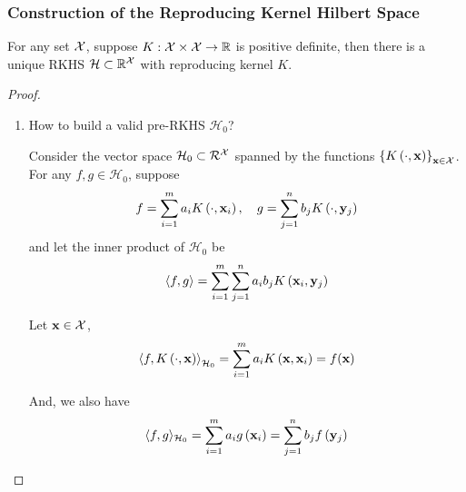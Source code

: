 \subsubsection{Construction of the Reproducing Kernel Hilbert Space}

\begin{theorem} \label{thm:morse-aronszajn}
	For any set ${\mathcal X}$, suppose $K:{\mathcal X}\times{\mathcal X}\rightarrow{\mathbb R}$ is positive definite, then there is a unique RKHS $\mathcal{H}\subset{\mathbb R}^{{\mathcal X}}$ with reproducing kernel $K$.
\end{theorem}

\begin{proof}
	\begin{enumerate}
		\item How to build a valid pre-RKHS $\mathcal{H}_{0}$?

		      Consider the vector space $\mathcal{H}_{0}\subset\mathcal{R}^{{\mathcal X}}$ spanned by the functions $\left\{K\left(\cdot,{\bf x}\right)\right\}_{{\bf x}\in{\mathcal X}}$. For any $f,g\in\mathcal{H}_{0}$, suppose
		      \begin{equation*}
			      f=\sum_{i=1}^{m}a_{i}K\left(\cdot,{\bf x}_{i}\right),\quad g=\sum_{j=1}^{n}b_{j}K\left(\cdot,\mathbf{y}_{j}\right)
		      \end{equation*}
		      and let the inner product of $\mathcal{H}_{0}$ be
		      \begin{equation}
			      \left\langle f,g\right\rangle=\sum_{i=1}^{m}\sum_{j=1}^{n}a_{i}b_{j}K\left({\bf x}_{i},\mathbf{y}_{j}\right)
			      \label{eq:definition-pre-rkhs-inner-product}
		      \end{equation}

		      Let ${\bf x}\in{\mathcal X}$,
		      \begin{equation*}
			      \left\langle f,K\left(\cdot,{\bf x}\right)\right\rangle_{\mathcal{H}_{0}}=\sum_{i=1}^{m}a_{i} K\left({\bf x},{\bf x}_{i}\right)=f({\bf x})
			      \label{eq:reproducing-kernel}
		      \end{equation*}

		      And, we also have
		      \begin{equation*}
			      \langle f, g\rangle_{\mathcal{H}_{0}}=\sum_{i=1}^{m} a_{i} g\left({\bf x}_{i}\right)=\sum_{j=1}^{n} b_{j} f\left(\mathbf{y}_{j}\right)
		      \end{equation*}


\end{enumerate}
\end{proof}
